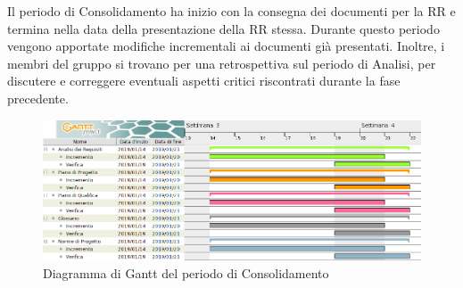 Il periodo di Consolidamento ha inizio con la consegna dei documenti per la RR e termina nella data della presentazione della RR stessa. \newline
Durante questo periodo vengono apportate modifiche incrementali ai documenti già presentati. Inoltre, i membri del gruppo si trovano per una retrospettiva sul periodo di Analisi, per discutere e correggere eventuali aspetti critici riscontrati durante la fase precedente.

\begin{figure}[H]
	\includegraphics[width=1\linewidth]{Pianificazione/Consolidamento_Gantt.png}
	\caption{Diagramma di Gantt del periodo di Consolidamento}
\end{figure}